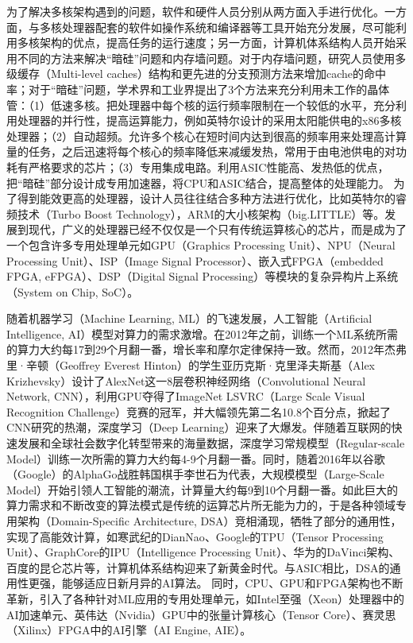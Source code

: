 为了解决多核架构遇到的问题，软件和硬件人员分别从两方面入手进行优化。一方面，与多核处理器配套的软件如操作系统和编译器等工具开始充分发展，尽可能利用多核架构的优点，提高任务的运行速度；另一方面，计算机体系结构人员开始采用不同的方法来解决“暗硅”问题和内存墙问题。对于内存墙问题，研究人员使用多级缓存（Multi-level caches）结构和更先进的分支预测方法来增加cache的命中率；对于“暗硅”问题，学术界和工业界提出了3个方法来充分利用未工作的晶体管\cite{is_dark_silicon}：（1）低速多核。把处理器中每个核的运行频率限制在一个较低的水平，充分利用处理器的并行性，提高运算能力，例如英特尔设计的采用太阳能供电的x86多核处理器\cite{solar_x86}；（2）自动超频。允许多个核心在短时间内达到很高的频率用来处理高计算量的任务，之后迅速将每个核心的频率降低来减缓发热，常用于由电池供电的对功耗有严格要求的芯片；（3）专用集成电路。利用ASIC性能高、发热低的优点，把“暗硅”部分设计成专用加速器，将CPU和ASIC结合，提高整体的处理能力。
为了得到能效更高的处理器，设计人员往往结合多种方法进行优化，比如英特尔的睿频技术（Turbo Boost Technology）\cite{intel_turbo_boost}，ARM的大小核架构（big.LITTLE）\cite{arm_big_little}等。发展到现代，广义的处理器已经不仅仅是一个只有传统运算核心的芯片，而是成为了一个包含许多专用处理单元如GPU（Graphics Processing Unit）、NPU（Neural Processing Unit）、ISP（Image Signal Processor）、嵌入式FPGA（embedded FPGA, eFPGA）、DSP（Digital Signal Processing）等模块的复杂异构片上系统（System on Chip, SoC）。

随着机器学习（Machine Learning, ML）的飞速发展，人工智能（Artificial Intelligence, AI）模型对算力的需求激增。在2012年之前，训练一个ML系统所需的算力大约每17到29个月翻一番\cite{AI:computing_demand_trend}，增长率和摩尔定律保持一致。然而，2012年杰弗里·辛顿（Geoffrey Everest Hinton）的学生亚历克斯·克里泽夫斯基（Alex Krizhevsky）设计了AlexNet\cite{AI:AlexNet}这一8层卷积神经网络（Convolutional Neural Network, CNN），利用GPU夺得了ImageNet LSVRC（Large Scale Visual Recognition Challenge）竞赛的冠军，并大幅领先第二名10.8个百分点，掀起了CNN研究的热潮，深度学习（Deep Learning）迎来了大爆发。伴随着互联网的快速发展和全球社会数字化转型带来的海量数据，深度学习常规模型（Regular-scale Model）训练一次所需的算力大约每4-9个月翻一番\cite{AI:computing_demand_trend}。同时，随着2016年以谷歌（Google）的AlphaGo\cite{AI:AlphaGo}战胜韩国棋手李世石为代表，大规模模型（Large-Scale Model）开始引领人工智能的潮流，计算量大约每9到10个月翻一番\cite{AI:computing_demand_trend}。如此巨大的算力需求和不断改变的算法模式是传统的运算芯片所无能为力的，于是各种领域专用架构（Domain-Specific Architecture, DSA）竞相涌现，牺牲了部分的通用性，实现了高能效计算，如寒武纪的DianNao\cite{Accelerator:DianNao}、Google的TPU（Tensor Processing Unit）\cite{Accelerator:TPU}、GraphCore的IPU（Intelligence Processing Unit）\cite{Accelerator:IPU}、华为的DaVinci架构\cite{Accelerator:DaVinci}、百度的昆仑芯片\cite{Accelerator:Kunlun}等，计算机体系结构迎来了新黄金时代\cite{new_golden}。与ASIC相比，DSA的通用性更强，能够适应日新月异的AI算法。
同时，CPU、GPU和FPGA架构也不断革新，引入了各种针对ML应用的专用处理单元，如Intel至强（Xeon）处理器中的AI加速单元\cite{Accelerator:intel_xeon_4th}、英伟达（Nvidia）GPU中的张量计算核心（Tensor Core）\cite{Accelerator:nvdia_h100_tensor_core_4th}、赛灵思（Xilinx）FPGA中的AI引擎（AI Engine, AIE）\cite{Accelerator:amd_versal_AIE}。

